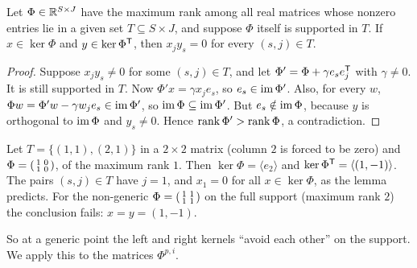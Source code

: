 \begin{lemma}\label{lem:kernel}
Let $\Phi\in\mathbb R^{S\times J}$ have the maximum rank among all real matrices
whose nonzero entries lie in a given set $T\subseteq S\times J$, and suppose
$\Phi$ itself is supported in $T$. If $x\in\ker\Phi$ and $y\in\ker\Phi^\mathsf T$, then
$x_jy_s=0$ for every $(s,j)\in T$.
\end{lemma}

\begin{proof}
Suppose $x_jy_s\ne0$ for some $(s,j)\in T$, and let $\Phi'=\Phi+\gamma e_se_j^\mathsf T$ with
$\gamma\ne0$. It is still supported in $T$. Now $\Phi'x=\gamma x_je_s$, so
$e_s\in\operatorname{im}\Phi'$. Also, for every $w$, $\Phi w=\Phi'w-\gamma w_je_s\in\operatorname{im}\Phi'$, so
$\operatorname{im}\Phi\subseteq\operatorname{im}\Phi'$. But $e_s\notin\operatorname{im}\Phi$, because $y$ is orthogonal to
$\operatorname{im}\Phi$ and $y_s\ne0$. Hence $\operatorname{rank}\Phi'>\operatorname{rank}\Phi$, a contradiction.
\end{proof}

\begin{example}
Let $T=\{(1,1),(2,1)\}$ in a $2\times2$ matrix (column $2$ is forced to be
zero) and $\Phi=\begin{psmallmatrix}1&0\\1&0\end{psmallmatrix}$, of the maximum rank $1$. Then
$\ker\Phi=\langle e_2\rangle$ and $\ker\Phi^\mathsf T=\langle(1,-1)\rangle$. The pairs
$(s,j)\in T$ have $j=1$, and $x_1=0$ for all $x\in\ker\Phi$, as the lemma predicts.
For the non-generic $\Phi=\begin{psmallmatrix}1&1\\1&1\end{psmallmatrix}$ on the full support (maximum
rank $2$) the conclusion fails: $x=y=(1,-1)$.
\end{example}

So at a generic point the left and right kernels ``avoid each other'' on
the support. We apply this to the matrices $\Phi^{p,i}$.

